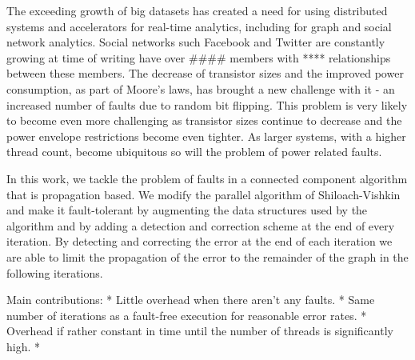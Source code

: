 

The exceeding growth of big datasets has created a need for using distributed systems and 
accelerators for real-time analytics, including for graph and social network analytics. Social 
networks such Facebook and Twitter are constantly growing  at time of writing have over #### 
members with **** relationships between these members.
The decrease of transistor sizes and the improved power consumption, as part of Moore's laws, has 
brought a new challenge with it - an increased number of faults due to random bit flipping. This 
problem is very likely to become even more challenging as transistor sizes continue to decrease and 
the power envelope restrictions become even tighter. As larger systems, with a higher thread count, 
become ubiquitous so will the problem of power related faults.

In this work, we tackle the problem of faults in a connected component algorithm that is 
propagation based. We modify the parallel algorithm of Shiloach-Vishkin \cite{shiloachvishkin} and 
make it fault-tolerant by augmenting the data structures used by the algorithm and by adding a 
detection and correction scheme at the end of every iteration. By detecting and correcting the 
error at the end of each iteration we are able to limit the propagation of the error to the 
remainder of the graph in the following iterations.

Main contributions:
* Little overhead when there aren't any faults.
* Same number of iterations as a fault-free execution for reasonable error rates.
* Overhead if rather constant in time until the number of threads is significantly high.
* 



